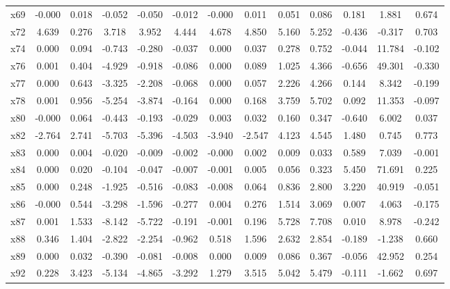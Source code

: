 {\begin{longtable}{@{\extracolsep\fill} ccccccccccccc}
     x69 & -0.000 & 0.018 & -0.052 & -0.050 & -0.012 & -0.000 &  0.011 & 0.051 & 0.086 &     0.181 &     1.881 &  0.674 \\
     x72 &  4.639 & 0.276 &  3.718 &  3.952 &  4.444 &  4.678 &  4.850 & 5.160 & 5.252 &    -0.436 &    -0.317 &  0.703 \\
     x74 &  0.000 & 0.094 & -0.743 & -0.280 & -0.037 &  0.000 &  0.037 & 0.278 & 0.752 &    -0.044 &    11.784 & -0.102 \\
     x76 &  0.001 & 0.404 & -4.929 & -0.918 & -0.086 &  0.000 &  0.089 & 1.025 & 4.366 &    -0.656 &    49.301 & -0.330 \\
     x77 &  0.000 & 0.643 & -3.325 & -2.208 & -0.068 &  0.000 &  0.057 & 2.226 & 4.266 &     0.144 &     8.342 & -0.199 \\
     x78 &  0.001 & 0.956 & -5.254 & -3.874 & -0.164 &  0.000 &  0.168 & 3.759 & 5.702 &     0.092 &    11.353 & -0.097 \\
     x80 & -0.000 & 0.064 & -0.443 & -0.193 & -0.029 &  0.003 &  0.032 & 0.160 & 0.347 &    -0.640 &     6.002 &  0.037 \\
     x82 & -2.764 & 2.741 & -5.703 & -5.396 & -4.503 & -3.940 & -2.547 & 4.123 & 4.545 &     1.480 &     0.745 &  0.773 \\
     x83 &  0.000 & 0.004 & -0.020 & -0.009 & -0.002 & -0.000 &  0.002 & 0.009 & 0.033 &     0.589 &     7.039 & -0.001 \\
     x84 &  0.000 & 0.020 & -0.104 & -0.047 & -0.007 & -0.001 &  0.005 & 0.056 & 0.323 &     5.450 &    71.691 &  0.225 \\
     x85 &  0.000 & 0.248 & -1.925 & -0.516 & -0.083 & -0.008 &  0.064 & 0.836 & 2.800 &     3.220 &    40.919 & -0.051 \\
     x86 & -0.000 & 0.544 & -3.298 & -1.596 & -0.277 &  0.004 &  0.276 & 1.514 & 3.069 &     0.007 &     4.063 & -0.175 \\
     x87 &  0.001 & 1.533 & -8.142 & -5.722 & -0.191 & -0.001 &  0.196 & 5.728 & 7.708 &     0.010 &     8.978 & -0.242 \\
     x88 &  0.346 & 1.404 & -2.822 & -2.254 & -0.962 &  0.518 &  1.596 & 2.632 & 2.854 &    -0.189 &    -1.238 &  0.660 \\
     x89 &  0.000 & 0.032 & -0.390 & -0.081 & -0.008 &  0.000 &  0.009 & 0.086 & 0.367 &    -0.056 &    42.952 &  0.254 \\
     x92 &  0.228 & 3.423 & -5.134 & -4.865 & -3.292 &  1.279 &  3.515 & 5.042 & 5.479 &    -0.111 &    -1.662 &  0.697 \\

\end{longtable}}
